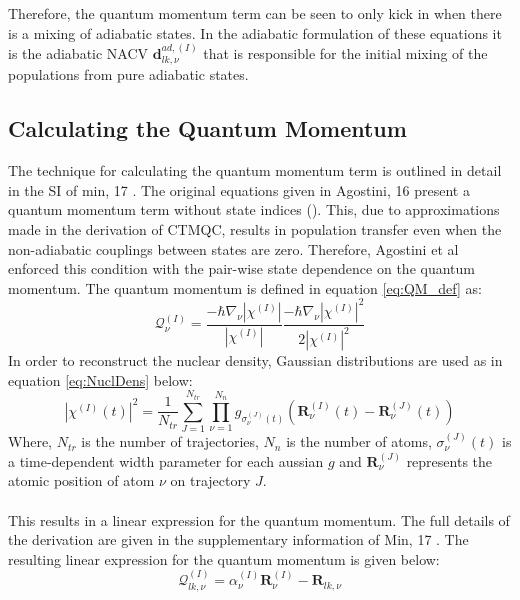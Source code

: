 Therefore, the quantum momentum term can be seen to only kick in when there is a mixing of adiabatic states. In the adiabatic formulation of these equations it is the adiabatic NACV $\mathbf{d}_{lk, \nu}^{ad, (I)}$ that is responsible for the initial mixing of the populations from pure adiabatic states.
 \subsection{Calculating the Quantum Momentum \label{sec:calc_QM}}
 \label{sect:QM_Calc}
 The technique for calculating the quantum momentum term is outlined in detail in the SI of min, 17 \cite{min_ab_2017}. The original equations given in Agostini, 16\cite{agostini_quantum-classical_2016} present a quantum momentum term without state indices (). This, due to approximations made in the derivation of CTMQC, results in population transfer even when the non-adiabatic couplings between states are zero. Therefore, Agostini et al enforced this condition with the pair-wise state dependence on the quantum momentum. The quantum momentum is defined in equation \eqref{eq:QM_def} as:
\begin{equation}
  \mathcal{Q}_{\nu}^{(I)} = \frac{-\hbar \nabla_{\nu} |\chi^{(I)}|}{|\chi^{(I)}|} \frac{-\hbar \nabla_{\nu}                            |\chi^{(I)}|^2}{2|\chi^{(I)}|^2}
  \label{eq:QM_def}
\end{equation}
In order to reconstruct the nuclear density, Gaussian distributions are used as in equation \eqref{eq:NuclDens} below:
\begin{equation}
	|\chi^{(I)}(t)|^2 = \frac{1}{N_{tr}} \sum_{J=1}^{N_{tr}} \prod_{\nu=1}^{N_n} g_{\sigma_{\nu}^{(J)}(t)} \left(\mathbf{R}_{\nu}^{(I)}(t) - \mathbf{R}_{\nu}^{(J)}(t)\right)
	\label{eq:NuclDens}
\end{equation}
Where, $N_{tr}$ is the number of trajectories, $N_{n}$ is the number of atoms, $\sigma_{\nu}^{(J)}(t)$ is a time-dependent width parameter for each aussian $g$ and $\mathbf{R}_{\nu}^{(J)}$ represents the atomic position of atom $\nu$ on trajectory $J$.
\\\\
This results in a linear expression for the quantum momentum.
The full details of the derivation are given in the supplementary information of Min, 17 \cite{min_ab_2017}. The resulting linear expression for the quantum momentum is given below:
\begin{equation}
  \mathcal{Q}_{lk, \nu}^{(I)} = \alpha_{\nu}^{(I)} \mathbf{R}_{\nu}^{(I)} - \mathbf{R}_{lk, \nu}
  \label{eq:QM_lin}
\end{equation}
